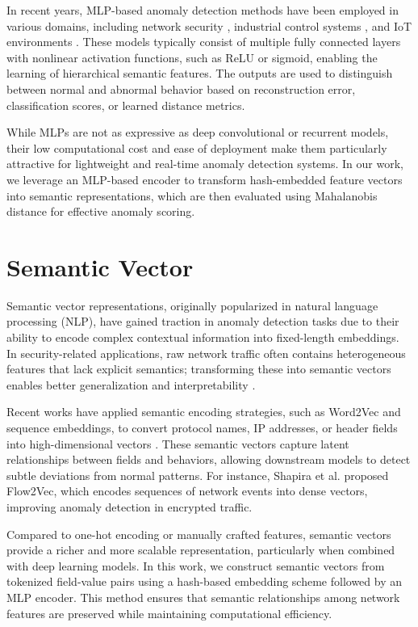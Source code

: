 \begin{ZhChapter}
    In recent years, MLP-based anomaly detection methods have been employed in various domains, including network security \cite{moustafa2019new}, industrial control systems \cite{kim2020cyber}, and IoT environments \cite{nguyen2020autoencoder}. These models typically consist of multiple fully connected layers with nonlinear activation functions, such as ReLU or sigmoid, enabling the learning of hierarchical semantic features. The outputs are used to distinguish between normal and abnormal behavior based on reconstruction error, classification scores, or learned distance metrics.

    While MLPs are not as expressive as deep convolutional or recurrent models, their low computational cost and ease of deployment make them particularly attractive for lightweight and real-time anomaly detection systems. In our work, we leverage an MLP-based encoder to transform hash-embedded feature vectors into semantic representations, which are then evaluated using Mahalanobis distance for effective anomaly scoring.


    \section{Semantic Vector}
    Semantic vector representations, originally popularized in natural language processing (NLP), have gained traction in anomaly detection tasks due to their ability to encode complex contextual information into fixed-length embeddings. In security-related applications, raw network traffic often contains heterogeneous features that lack explicit semantics; transforming these into semantic vectors enables better generalization and interpretability \cite{mikolov2013distributed}.

    Recent works have applied semantic encoding strategies, such as Word2Vec and sequence embeddings, to convert protocol names, IP addresses, or header fields into high-dimensional vectors \cite{shapira2021flow,li2020embedding}. These semantic vectors capture latent relationships between fields and behaviors, allowing downstream models to detect subtle deviations from normal patterns. For instance, Shapira et al. \cite{shapira2021flow} proposed Flow2Vec, which encodes sequences of network events into dense vectors, improving anomaly detection in encrypted traffic.

    Compared to one-hot encoding or manually crafted features, semantic vectors provide a richer and more scalable representation, particularly when combined with deep learning models. In this work, we construct semantic vectors from tokenized field-value pairs using a hash-based embedding scheme followed by an MLP encoder. This method ensures that semantic relationships among network features are preserved while maintaining computational efficiency.



\end{ZhChapter}